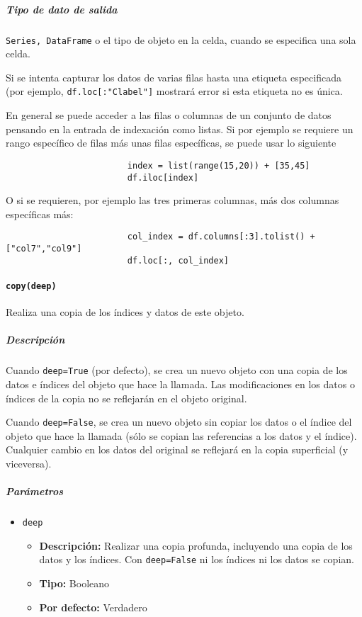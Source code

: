 \subparagraph{Tipo de dato de salida} \texttt{Series, DataFrame} o el tipo de
objeto en la celda, cuando se especifica una sola celda.

Si se intenta capturar los datos de varias filas hasta una etiqueta
especificada (por ejemplo, \texttt{df.loc[:"Clabel"]} mostrará error si esta
etiqueta no es única.

En general se puede acceder a las filas o columnas de un conjunto de datos
pensando en la entrada de indexación como listas. Si por ejemplo se requiere un
rango específico de filas más unas filas específicas, se puede usar lo
siguiente

\begin{verbatim}
                        index = list(range(15,20)) + [35,45]
                        df.iloc[index]
                        \end{verbatim}
O si se requieren, por ejemplo las tres primeras columnas, más dos columnas
específicas más:
\begin{verbatim}
                        col_index = df.columns[:3].tolist() + ["col7","col9"]
                        df.loc[:, col_index]
                        \end{verbatim}

\paragraph{\texttt{copy(deep)}} Realiza una copia de los índices y datos de
este objeto.

\subparagraph{\textbf{Descripción}}
Cuando \texttt{deep=True} (por defecto), se crea un nuevo objeto con una copia
de los datos e índices del objeto que hace la llamada. Las modificaciones en
los datos o índices de la copia no se reflejarán en el objeto original.

Cuando \texttt{deep=False}, se crea un nuevo objeto sin copiar los datos o el
índice del objeto que hace la llamada (sólo se copian las referencias a los
datos y el índice). Cualquier cambio en los datos del original se reflejará en
la copia superficial (y viceversa).

\subparagraph{\textbf{Parámetros}}
\begin{itemize}
    \item \texttt{deep}
          \begin{itemize}
              \item \textbf{Descripción:} Realizar una copia profunda,
                    incluyendo una copia de los datos y los índices. Con \texttt{deep=False} ni los
                    índices ni los datos se copian.
              \item \textbf{Tipo:} Booleano
              \item \textbf{Por defecto:} Verdadero
          \end{itemize}
\end{itemize}

